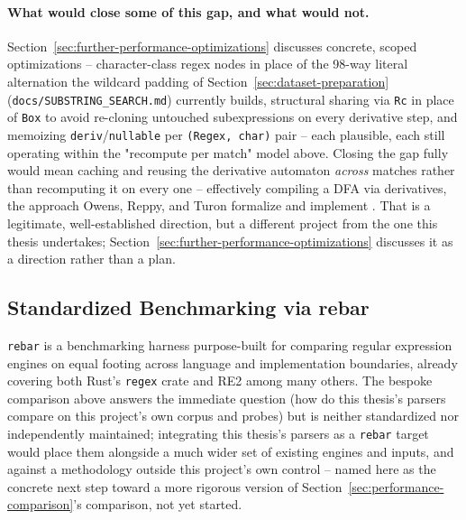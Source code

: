 \paragraph{What would close some of this gap, and what would not.}
Section~\ref{sec:further-performance-optimizations} discusses concrete,
scoped optimizations -- character-class regex nodes in place of the
98-way literal alternation the wildcard padding of
Section~\ref{sec:dataset-preparation} (\texttt{docs/SUBSTRING\_SEARCH.md})
currently builds, structural sharing via \texttt{Rc} in place of
\texttt{Box} to avoid re-cloning untouched subexpressions on every
derivative step, and memoizing \texttt{deriv}/\texttt{nullable} per
\texttt{(Regex, char)} pair -- each plausible, each still operating
within the "recompute per match" model above. Closing the gap fully
would mean caching and reusing the derivative automaton \emph{across}
matches rather than recomputing it on every one -- effectively compiling
a DFA via derivatives, the approach Owens, Reppy, and Turon formalize and
implement \citep{owens2009}. That is a legitimate, well-established
direction, but a different project from the one this thesis undertakes;
Section~\ref{sec:further-performance-optimizations} discusses it as a
direction rather than a plan.

\subsection{Standardized Benchmarking via rebar}
\label{sec:rebar-comparison}

\texttt{rebar} is a benchmarking harness purpose-built for comparing
regular expression engines on equal footing across language and
implementation boundaries, already covering both Rust's \texttt{regex}
crate and RE2 among many others. The bespoke comparison above answers
the immediate question (how do this thesis's parsers compare on this
project's own corpus and probes) but is neither standardized nor
independently maintained; integrating this thesis's parsers as a
\texttt{rebar} target would place them alongside a much wider set of
existing engines and inputs, and against a methodology outside this
project's own control -- named here as the concrete next step toward a
more rigorous version of Section~\ref{sec:performance-comparison}'s
comparison, not yet started.
